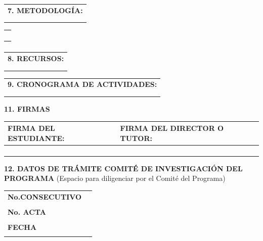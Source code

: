 \documentclass[9pt,letterpaper]{article}
\newenvironment{introduccion2}[1]{
\begin{center}
	\begin{tabular}{|p{15.5cm}|}\hline
	\textsf{\textbf{}} }{ \\ \hline
	\end{tabular}
\end{center}	
}
\newenvironment{metodologia}[1]{
\begin{center}
	\begin{tabular}{|p{15.5cm}|}\hline
	\textsf{\textbf{7. METODOLOGÍA:}} \\
	#1 \\}{ \\  \hline
	\end{tabular}
\end{center}	
}
\newenvironment{recursos}[1]{
\begin{center}
	\begin{tabular}{|p{15.5cm}|}\hline
	\textsf{\textbf{8. RECURSOS:}} \\
	#1 \\}{ \\  \hline
	\end{tabular}
\end{center}	
}
\newenvironment{cronograma}[1]{
\begin{center}
	\begin{tabular}{|p{15.5cm}|}\hline
	\textsf{\textbf{9. CRONOGRAMA DE ACTIVIDADES:}} \\
	#1 \\}{ \\  \hline
	\end{tabular}
\end{center}	
}
\newenvironment{esperados}{
	\begin{center}
		\begin{tabular}{|p{15.5cm}|}\hline
			\textsf{\textbf{11. RESULTADOS ESPERADOS: }} \\
			\\
		}{\\ \hline
		\end{tabular}
	\end{center}	
}
\newenvironment{presupuesto}{
	\begin{center}
		\begin{tabular}{|p{15.5cm}|}\hline
			\textsf{\textbf{10. PRESUPUESTO (En caso de modalidad Investigación) Y FUENTES DE FINANCIACIÓN (En caso de modalidad Profundización)}} \\
			\\
		}{\\ \hline
		\end{tabular}
	\end{center}	
}
\newenvironment{firmas}{
\noindent	\textsf{\textbf{11. FIRMAS}}
	\begin{center} 
		\begin{tabular}{|p{7.5cm}|p{7.5cm}|}\hline
			\textsf{\textbf{FIRMA DEL ESTUDIANTE:}} &\textsf{\textbf{FIRMA DEL DIRECTOR O TUTOR:}} \\ \hline
			& \\
			& \\
			& \\
			& 
		}{\\ \hline
		\end{tabular}
	\end{center}	
}
\newenvironment{tramite}{
\noindent	\textsf{\textbf{12. DATOS DE TRÁMITE COMITÉ DE INVESTIGACIÓN DEL PROGRAMA} (Espacio para diligenciar por el Comité del Programa)}
	\begin{center}
		\begin{tabular}{|p{5cm}|p{5cm}|}\hline
			\textsf{\textbf{No.\n CONSECUTIVO}} & \\ 
			& \\ \hline
			\textsf{\textbf{No. ACTA}} & \\
			& \\ \hline
			\textsf{\textbf{FECHA}} & \\
			& 
		}{\\ \hline
		\end{tabular}
	\end{center}	
}
\begin{document}
\begin{metodologia}{}
	
\end{metodologia}

\begin{introduccion2}{}
    
\end{introduccion2}

\begin{introduccion2}{}
    
\end{introduccion2}

\begin{recursos}{}
	
\end{recursos}

\begin{cronograma}{}
	
\end{cronograma}

% 	

% 	

\begin{bibliografia}
\end{bibliografia}

\begin{firmas}
\end{firmas}

\begin{tramite}
\end{tramite}
\end{document}
